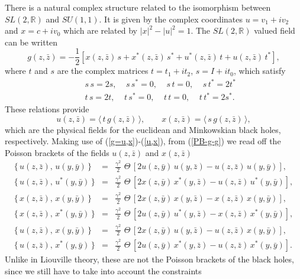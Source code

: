 \documentclass[a4paper,12pt]{article}
\newcommand{\rr}{\mathbb{R}}
\begin{document}
There is a natural complex structure related to the isomorphism between
$SL(2,\rr)$ and $SU(1,1)$. It is given by the complex coordinates
$u=v_1+iv_2$ and $x=c+iv_0$ which are related by $|x|^2-|u|^2=1$.
The $SL(2,\rr)$ valued field
 can be written
\begin{equation}\label{g=u,x}
g(z,\bar z)=-\frac{1}{2}\left[x(z,\bar z)\,s+x^*(z,\bar z)
\,s^*+u^*(z,\bar z)\,t+u(z,\bar z)\,t^*\right],
\end{equation}
where $t$ and $s$ are the complex matrices $t=t_1+it_2$, $s=I+it_0$,
which satisfy
\begin{eqnarray}\label{s-t}
&&s\,s=2s,~~~~~s\,s^*=0,~~~~~s\,t=0,~~~~~s\,t^*=2t^*\nonumber\\
&&t\,s=2t,~~~~~t\,s^*=0,~~~~~t\,t=0,~~~~~t\,t^*=2s^*.
\end{eqnarray}
These relations provide
\begin{equation}\label{u,x}
u(z,\bar z)=\langle \,t\,g(z,\bar z)
\,\rangle,~~~~~~~~~x(z,\bar z)=\langle \,s\,g(z,\bar z)\,\rangle,
\end{equation}
which are the physical fields for the euclidean and Minkowskian black
holes, respectively.
Making use of (\ref{g=u,x})-(\ref{u,x}), from (\ref{PB-g-g}) we
read off the Poisson brackets of the fields $u(z,\bar z)$ and $x(z,\bar z)$
\begin{eqnarray}\label{PB-u-u}
\{\,u(z,\bar z),\, u(y,\bar y)\,\}&=&\frac{\gamma^2}{2}\,
\,\Theta\,
[2u(z,\bar y)\,u(y,\bar z)-
u(z,\bar z)\,u(y,\bar y)], \nonumber\\
\{\,u(z,\bar z),\, u^*(y,\bar y)\,\}&=&\frac{\gamma^2}{2}\,
\,\Theta\,
[2 x(z,\bar y)\,x^*(y,\bar z)-
u(z,\bar z)\,u^*(y,\bar y)], \nonumber \\
\{\,x(z,\bar z),\, x(y,\bar y)\,\}&=&\frac{\gamma^2}{2}\,
\,\Theta\,
[2x(z,\bar y)\,x(y,\bar z)-
x(z,\bar z)\,x(y,\bar y)], \nonumber\\
\{\,x(z,\bar z),\, x^*(y,\bar y)\,\}&=&\frac{\gamma^2}{2}\,
\,\Theta\,
[2u(z,\bar y)\,u^*(y,\bar z)-
x(z,\bar z)\,x^*(y,\bar y)], \nonumber\\
\{\,u(z,\bar z),\, x(y,\bar y)\,\}&=&\frac{\gamma^2}{2}\,
\,\Theta\,
[2x(z,\bar y)\,u(y,\bar z)-
u(z,\bar z)\,x(y,\bar y)], \nonumber\\
\{\,u(z,\bar z),\, x^*(y,\bar y)\,\}&=&\frac{\gamma^2}{2}\,
\,\Theta\,
[2u(z,\bar y)\,x^*(y,\bar z)-
u(z,\bar z)\,x^*(y,\bar y)].
\end{eqnarray}
Unlike in Liouville theory, these are not the Poisson brackets
of the black holes, since we still have to take into account the constraints
\end{document}
